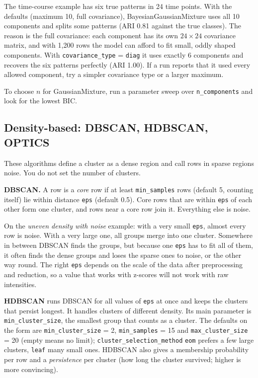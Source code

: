\documentclass[11pt,a4paper]{article}
\newcommand{\param}[1]{\texttt{#1}}         %
\begin{document}
\begin{example}
The time-course example has six true patterns in 24 time points. With the defaults (maximum 10, full
covariance), BayesianGaussianMixture uses all 10 components and splits some patterns (ARI 0.81 against the true
classes). The reason is the full covariance: each component has its own $24\times24$ covariance matrix, and with
1{,}200 rows the model can afford to fit small, oddly shaped components. With \param{covariance\_type} =
\texttt{diag} it uses exactly 6 components and recovers the six patterns perfectly (ARI 1.00). If a run reports
that it used every allowed component, try a simpler covariance type or a larger maximum.

To choose $n$ for GaussianMixture, run a parameter sweep over \param{n\_components} and look for the lowest BIC.
\end{example}

\subsection{Density-based: DBSCAN, HDBSCAN, OPTICS}

These algorithms define a cluster as a dense region and call rows in sparse regions noise. You do not set the number
of clusters.

\textbf{DBSCAN.} A row is a \emph{core} row if at least \param{min\_samples} rows (default 5, counting itself) lie
within distance \param{eps} (default 0.5). Core rows that are within \param{eps} of each other form one cluster, and
rows near a core row join it. Everything else is noise.

\begin{example}
On the \emph{uneven density with noise} example: with a very small \param{eps}, almost every row is noise. With a
very large one, all groups merge into one cluster. Somewhere in between DBSCAN finds the groups, but because one
\param{eps} has to fit all of them, it often finds the dense groups and loses the sparse ones to noise, or the
other way round. The right \param{eps} depends on the scale of the data after preprocessing and reduction, so a value
that works with z-scores will not work with raw intensities.
\end{example}

\textbf{HDBSCAN} runs DBSCAN for all values of \param{eps} at once and keeps the clusters that persist longest. It
handles clusters of different density. Its main parameter is \param{min\_cluster\_size}, the smallest group that
counts as a cluster. The defaults on the form are \param{min\_cluster\_size} = 2, \param{min\_samples} = 15 and
\param{max\_cluster\_size} = 20 (empty means no limit); \param{cluster\_selection\_method} \texttt{eom} prefers a
few large clusters, \texttt{leaf} many small ones. HDBSCAN also gives a membership probability per row and a
\emph{persistence} per cluster (how long the cluster survived; higher is more convincing).
\end{document}
